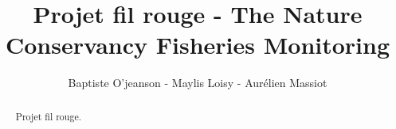 \documentclass{article}
\begin{document}
\title{Projet fil rouge - The Nature Conservancy Fisheries Monitoring}
\author{Baptiste O'jeanson - Maylis Loisy - Aurélien Massiot}

\maketitle

\begin{abstract}
Projet fil rouge.
\end{abstract}
\end{document}
